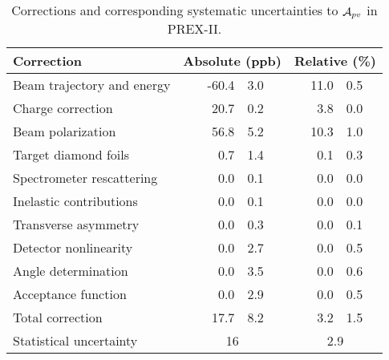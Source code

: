 \begin{table}
    \centering
    \begin{tabular}{l r@{ $\pm$ }l r@{ $\pm$ }l}
	\hline
	Correction & \multicolumn{2}{c}{Absolute (ppb)}	& \multicolumn{2}{c}{Relative (\%)}   \\
	\hline
	Beam trajectory and energy  & -60.4	& 3.0	& 11.0	& 0.5	\\ 
	Charge correction           & 20.7	& 0.2   & 3.8	& 0.0   \\ 
	\hline
	Beam polarization           & 56.8	& 5.2   & 10.3	& 1.0   \\ 
	Target diamond foils        & 0.7	& 1.4   & 0.1	& 0.3   \\ 
	Spectrometer rescattering   & 0.0	& 0.1   & 0.0  	& 0.0   \\ 
	Inelastic contributions     & 0.0	& 0.1   & 0.0  	& 0.0   \\ 
	Transverse asymmetry        & 0.0	& 0.3   & 0.0  	& 0.1   \\ 
	Detector nonlinearity       & 0.0	& 2.7   & 0.0  	& 0.5   \\ 
	Angle determination         & 0.0	& 3.5   & 0.0  	& 0.6   \\ 
	Acceptance function         & 0.0	& 2.9   & 0.0  	& 0.5   \\ 
	\hline
	Total correction	    & 17.7	& 8.2	& 3.2	& 1.5	\\
	Statistical uncertainty	    & \multicolumn{2}{c}{16}	& \multicolumn{2}{c}{2.9}   \\
	\hline
    \end{tabular}
    \caption{Corrections and corresponding systematic uncertainties to $\mathcal{A}_{pv}$ in PREX-II.}
    \label{tab:prex_corrections}
\end{table}

